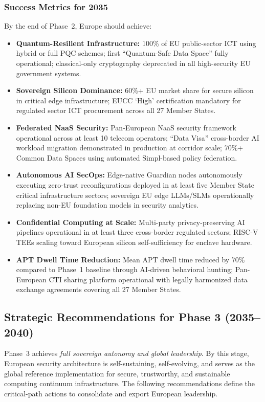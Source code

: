 \documentclass{ieeeaccess}
\begin{document}
\subsubsection*{Success Metrics for 2035}
By the end of Phase~2, Europe should achieve:
\begin{itemize}
    \item \textbf{Quantum-Resilient Infrastructure:}
    100\% of EU public-sector ICT using hybrid or full PQC schemes; first
    ``Quantum-Safe Data Space'' fully operational; classical-only cryptography deprecated
    in all high-security EU government systems.

    \item \textbf{Sovereign Silicon Dominance:}
    60\%+ EU market share for secure silicon in critical edge infrastructure; EUCC `High'
    certification mandatory for regulated sector ICT procurement across all 27 Member States.

    \item \textbf{Federated NaaS Security:}
    Pan-European NaaS security framework operational across at least 10 telecom operators;
    ``Data Visa'' cross-border AI workload migration demonstrated in production at corridor
    scale; 70\%+ Common Data Spaces using automated Simpl-based policy federation.

    \item \textbf{Autonomous AI SecOps:}
    Edge-native Guardian nodes autonomously executing zero-trust reconfigurations deployed
    in at least five Member State critical infrastructure sectors; sovereign EU edge
    LLMs/SLMs operationally replacing non-EU foundation models in security analytics.

    \item \textbf{Confidential Computing at Scale:}
    Multi-party privacy-preserving AI pipelines operational in at least three cross-border
    regulated sectors; RISC-V TEEs scaling toward European silicon self-sufficiency for
    enclave hardware.

    \item \textbf{APT Dwell Time Reduction:}
    Mean APT dwell time reduced by 70\% compared to Phase~1 baseline through AI-driven
    behavioral hunting; Pan-European CTI sharing platform operational with legally
    harmonized data exchange agreements covering all 27 Member States.
\end{itemize}


\subsection*{Strategic Recommendations for Phase 3 (2035--2040)}
Phase~3 achieves \emph{full sovereign autonomy and global leadership}. By this stage,
European security architecture is self-sustaining, self-evolving, and serves as the global
reference implementation for secure, trustworthy, and sustainable computing continuum
infrastructure. The following recommendations define the critical-path actions to consolidate
and export European leadership.
\end{document}
